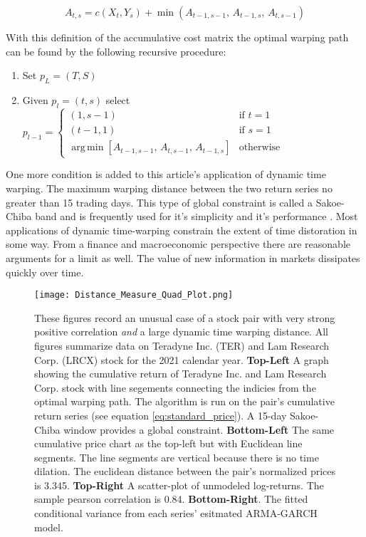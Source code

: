 \documentclass[12pt]{article}
\DeclareMathOperator*{\argmin}{arg\,min}
\begin{document}
\begin{equation} \label{eq:dtw_recursive_calculation}
    A_{t, s} = c(X_{t}, Y_{s}) + \min\left(A_{t-1, s-1}, \, A_{t-1, s}, \, A_{t, s-1}\right)
\end{equation}

With this definition of the accumulative cost matrix the optimal warping path can be found by the following recursive procedure:

\begin{enumerate}
    \item Set $p_{L} = (T, S)$
    \item Given $p_{l} = (t, s)$ select $p_{l - 1} = \begin{cases} (1, s-1) & \textrm{if } t=1 \\ (t-1,1) & \textrm{if } s=1 \\ 
                                            \argmin \left[ A_{t-1, s-1},\, A_{t, s-1},\, A_{t-1, s} \right] & \textrm{otherwise} \end{cases}$
\end{enumerate}

One more condition is added to this article's application of dynamic time warping. The maximum warping distance between the two return series no greater than 15 trading days. This type of global constraint is called a Sakoe-Chiba band \parencite{SakoeChiba_IEEE_1978} and is frequently used for it's simplicity and it's performance \parencite{geler2019dynamic}. Most applications of dynamic time-warping constrain the extent of time distoration in some way. From a finance and macroeconomic perspective there are reasonable arguments for a limit as well. The value of new information in markets dissipates quickly over time.

\begin{figure}
    \centering
    \texttt{[image: Distance\_Measure\_Quad\_Plot.png]}
    \caption{These figures record an unusual case of a stock pair with very strong positive correlation \textit{and} a large dynamic time warping distance. All figures summarize data on Teradyne Inc. (TER) and Lam Research Corp. (LRCX) stock for the 2021 calendar year. \textbf{Top-Left} A graph showing the cumulative return of Teradyne Inc. and Lam Research Corp. stock with line segements connecting the indicies from the optimal warping path. The algorithm is run on the pair's cumulative return series (see equation \ref{eq:standard_price}). A 15-day Sakoe-Chiba window provides a global constraint. \textbf{Bottom-Left} The same cumulative price chart as the top-left but with Euclidean line segments. The line segments are vertical because there is no time dilation. The euclidean distance between the pair's normalized prices is 3.345. \textbf{Top-Right} A scatter-plot of unmodeled log-returns. The sample pearson correlation is 0.84. \textbf{Bottom-Right}. The fitted conditional variance from each series' esitmated ARMA-GARCH model.}
    \label{fig:dtw_plot_stock_price_index_matching}
\end{figure}
\end{document}
